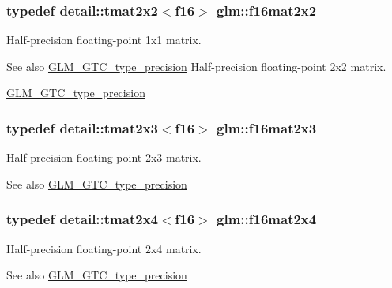 \subsubsection[{f16mat2x2}]{\setlength{\rightskip}{0pt plus 5cm}typedef detail\+::tmat2x2$<$f16$>$ {\bf glm\+::f16mat2x2}}\label{group__gtc__type__precision_ga1f4b12c53051603b62e6fa69e3b7a98b}
Half-\/precision floating-\/point 1x1 matrix. \begin{DoxySeeAlso}{See also}
\hyperlink{group__gtc__type__precision}{G\+L\+M\+\_\+\+G\+T\+C\+\_\+type\+\_\+precision} Half-\/precision floating-\/point 2x2 matrix. 

\hyperlink{group__gtc__type__precision}{G\+L\+M\+\_\+\+G\+T\+C\+\_\+type\+\_\+precision} 
\end{DoxySeeAlso}
\hypertarget{group__gtc__type__precision_ga8705b9a5a043c443df698f3274c7fc0e}{}
\subsubsection[{f16mat2x3}]{\setlength{\rightskip}{0pt plus 5cm}typedef detail\+::tmat2x3$<$f16$>$ {\bf glm\+::f16mat2x3}}\label{group__gtc__type__precision_ga8705b9a5a043c443df698f3274c7fc0e}
Half-\/precision floating-\/point 2x3 matrix. \begin{DoxySeeAlso}{See also}
\hyperlink{group__gtc__type__precision}{G\+L\+M\+\_\+\+G\+T\+C\+\_\+type\+\_\+precision} 
\end{DoxySeeAlso}
\hypertarget{group__gtc__type__precision_ga0764ac8adf2ac8909c100f9ce21eecba}{}
\subsubsection[{f16mat2x4}]{\setlength{\rightskip}{0pt plus 5cm}typedef detail\+::tmat2x4$<$f16$>$ {\bf glm\+::f16mat2x4}}\label{group__gtc__type__precision_ga0764ac8adf2ac8909c100f9ce21eecba}
Half-\/precision floating-\/point 2x4 matrix. \begin{DoxySeeAlso}{See also}
\hyperlink{group__gtc__type__precision}{G\+L\+M\+\_\+\+G\+T\+C\+\_\+type\+\_\+precision} 
\end{DoxySeeAlso}
\hypertarget{group__gtc__type__precision_ga565f29588755e09a686049d0f0c91af5}{}
